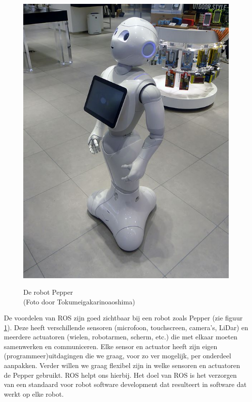 \begin{figure}[ht]
\begin{center}
\includegraphics[scale=0.5]{Pictures/robot_pepper.JPG}\\
\end{center}
\caption{De robot Pepper\\\tiny{(Foto door Tokumeigakarinoaoshima)}}\label{fig:pepper}
\end{figure}

De voordelen van ROS zijn goed zichtbaar bij een robot zoals Pepper (zie figuur \ref{fig:pepper}). Deze heeft verschillende sensoren (microfoon, touchscreen, camera's, LiDar) en meerdere actuatoren (wielen, robotarmen, scherm, etc.) die met elkaar moeten samenwerken en communiceren. Elke sensor en actuator heeft zijn eigen (programmeer)uitdagingen die we graag, voor zo ver mogelijk, per onderdeel aanpakken. Verder willen we graag flexibel zijn in welke sensoren en actuatoren de Pepper gebruikt. ROS helpt ons hierbij. Het doel van ROS is het verzorgen van een standaard voor robot software development dat resulteert in software dat werkt op elke robot. 

